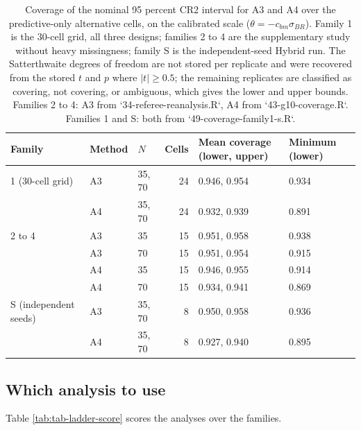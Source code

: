 \documentclass[
  11pt,
]{article}
\begin{document}
\begin{table}
\centering
\caption{\label{tab:stage3-coverage}Coverage of the nominal 95 percent CR2 interval for A3
      and A4 over the predictive-only alternative cells, on the
      calibrated scale ($\theta = -c_{bm}\sigma_{BR}$). Family 1 is
      the 30-cell grid, all three designs; families 2 to 4 are the
      supplementary study without heavy missingness; family S is the
      independent-seed Hybrid run. The Satterthwaite degrees of
      freedom are not stored per replicate and were recovered from the
      stored $t$ and $p$ where $|t| \ge 0.5$; the remaining
      replicates are classified as covering, not covering, or
      ambiguous, which gives the lower and upper bounds. Families 2 to
      4: A3 from `34-referee-reanalysis.R`, A4 from
      `43-g10-coverage.R`. Families 1 and S: both from
      `49-coverage-family1-s.R`.}
\centering
\fontsize{9}{11}\selectfont
\begin{tabular}[t]{lllrll}
\toprule
Family & Method & $N$ & Cells & Mean coverage (lower, upper) & Minimum (lower)\\
\midrule
1 (30-cell grid) & A3 & 35, 70 & 24 & 0.946, 0.954 & 0.934\\
 & A4 & 35, 70 & 24 & 0.932, 0.939 & 0.891\\
2 to 4 & A3 & 35 & 15 & 0.951, 0.958 & 0.938\\
 & A3 & 70 & 15 & 0.951, 0.954 & 0.915\\
 & A4 & 35 & 15 & 0.946, 0.955 & 0.914\\
 & A4 & 70 & 15 & 0.934, 0.941 & 0.869\\
S (independent seeds) & A3 & 35, 70 & 8 & 0.950, 0.958 & 0.936\\
 & A4 & 35, 70 & 8 & 0.927, 0.940 & 0.895\\
\bottomrule
\end{tabular}
\end{table}

\subsection*{Which analysis to use}\label{which-analysis-to-use}

Table \ref{tab:tab-ladder-score} scores the analyses over the
families.
\end{document}
